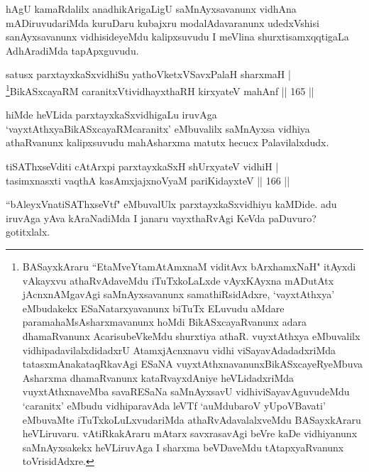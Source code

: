 \begin{artha}
hAgU kamaRdalilx anadhikArigaLigU saMnAyxsavanunx vidhAna mADiruvudariMda kuruDaru kubajxru modalAdavaranunx udedxVshisi sanAyxsavanunx vidhisideyeMdu kalipxsuvudu I meVlina shurxtisamxqqtigaLa AdhAradiMda tapApxguvudu.
\end{artha}



\begin{shl}
satusx parxtayxkaSxvidhiSu yathoVketxVSavxPalaH sharxmaH |\\
\footnote{BASayxkAraru ``EtaMveYtamAtAmxnaM viditAvx bArxhamxNaH" itAyxdi vAkayxvu athaRvAdaveMdu iTuTxkoLaLxde vAyxKAyxna mADutAtx jAcnxnAMgavAgi saMnAyxsavanunx samathiRsidAdxre, `vayxtAthxya' eMbudakekx ESaNatarxyavanunx biTuTx ELuvudu aMdare paramahaMsAsharxmavanunx hoMdi BikASxcayaRvanunx adara dhamaRvanunx AcarisubeVkeMdu shurxtiya athaR. vuyxtAthxya eMbuvalilx vidhipadavilalxdidadxrU AtamxjAcnxnavu vidhi viSayavAdadadxriMda tatasxmAnakataqRkavAgi ESaNA vuyxtAthxnavanunx\break BikASxcayeRyeMbuva Asharxma dhamaRvanunx kataRvayxdAniye heVLidadxriMda vuyxtAthxnaveMba savaRESaNa saMnAyxsavU vidhiviSayavAguvudeMdu `caranitx' eMbudu vidhiparavAda leVTf `auMdubaroV yUpoVBavati' eMbuvaMte iTuTxkoLuLxvudariMda athaR\-vAdavalalxveMdu BASayxkAraru heVLiruvaru. vAtiRkakAraru mAtarx savxrasavAgi beVre kaDe vidhiyanunx saMnAyxsakekx heVLiruvAga I sharxma beVDaveMdu tAtapxyaRvanunx toVrisidAdxre.}BikASxcayaRM caranitxVtividhayxthaRH kirxyateV mahAnf \hfill || 165 ||
\end{shl}

\begin{artha}
hiMde heVLida parxtayxkaSxvidhigaLu iruvAga `vayxtAthxya\break BikASxcayaRMcaranitx' eMbuvalilx saMnAyxsa vidhiya athaRvanunx kalipxsuvudu mahAsharxma matutx hecucx Palavilalxdudx.
\end{artha}

\begin{shl}
tiSAThxseVditi cAtArxpi parxtayxkaSxH shUrxyateV vidhiH |\\
tasimxnasxti vaqthA kasAmxjajxnoV\s yaM pariKidayxteV \hfill || 166 ||
\end{shl}

\begin{artha}
``bAleyxVnatiSAThxseVtf" eMbuvalUlx parxtayxkaSxvidhiyu kaMDide. adu iruvAga yAva kAraNadiMda I janaru vayxthaRvAgi KeVda paDuvuro? gotitxlalx.
\end{artha}

